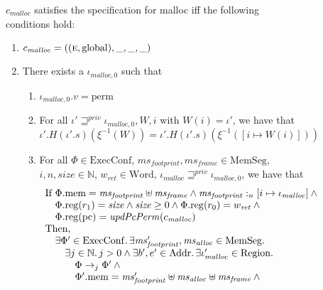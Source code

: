 \documentclass[format=acmsmall, review=true, screen=true]{acmart}
\newcommand{\var}[1]{\mathit{#1}}
\newcommand{\hs}{\var{ms}}
\newcommand{\ms}{\hs}
\newcommand{\pcreg}{\mathrm{pc}}
\newcommand{\heap}{\var{mem}}
\newcommand{\hsframe}{\hs_\var{frame}}
\newcommand{\size}{\var{size}}
\newcommand{\plainproj}[1]{\mathrm{#1}}
\newcommand{\memheap}[1][\Phi]{#1.\plainproj{mem}}
\newcommand{\memreg}[1][\Phi]{#1.\plainproj{reg}}
\newcommand{\plainfun}[2]{
  \ifthenelse{\equal{#2}{}}
  {\mathit{#1}}
  {\mathit{#1}(#2)}
}
\newcommand{\updatePcPerm}[1]{\plainfun{updPcPerm}{#1}}
\newcommand{\futurestr}{\mathbin{\sqsupseteq}^{\var{priv}}}
\newcommand{\heapSat}[3][\heap]{#1 :_{#2} #3}
\newcommand{\codelabel}[1]{\mathit{#1}}
\newcommand{\malloc}{\codelabel{malloc}}
\newcommand{\plaindom}[1]{\mathrm{#1}}
\newcommand{\Words}{\plaindom{Word}}
\newcommand{\Addrs}{\plaindom{Addr}}
\newcommand{\ExecConfs}{\plaindom{ExecConf}}
\newcommand{\HeapSegments}{\plaindom{MemSeg}}
\newcommand{\nats}{\mathbb{N}}
\newcommand{\Regions}{\plaindom{Region}}
\newcommand{\plainperm}[1]{\textsc{#1}}
\newcommand{\entry}{\plainperm{e}}
\newcommand{\plainlocality}[1]{\mathrm{#1}}
\newcommand{\glob}{\plainlocality{global}}
\newcommand{\plainview}[1]{\mathrm{#1}}
\newcommand{\perma}{\plainview{perm}}
\newcommand{\step}[1][]{\rightarrow_{#1}}
\newenvironment{toplas}%
    {\color{OliveGreen}}{}
\begin{document}
\begin{toplas}
\begin{figure}[htb]
  \centering
  \begin{definition}
    \label{spec:malloc}
    $c_\malloc$ satisfies the specification for malloc iff the following
    conditions hold:
    \begin{enumerate}
    \item \label{item:malloc-spec:eg} $c_\malloc = ((\entry,\glob),\_,\_,\_)$
    \item \label{item:malloc-spec:reg} There exists a $\iota_{\malloc,0}$ such that
      \begin{enumerate}
      \item \label{item:malloc-spec:perm} $\iota_{\malloc,0}.v = \perma$
      \item \label{item:malloc-spec:independent} For all $\iota' \futurestr \iota_{\malloc,0}, W,i$ with
        $W(i)=\iota'$, we have that
        \begin{equation*}
          \iota'.H (\iota'.s) (\xi^{-1}(W)) = \iota'.H (\iota'.s) (\xi^{-1}([i \mapsto W(i)]))
        \end{equation*}
      \item \label{item:malloc-spec:correct-exec} For all $\Phi \in \ExecConfs$, $\ms_{\var{footprint}}, \hsframe \in
        \HeapSegments$, $i, n, \size \in \nats$, $w_{\var{ret}} \in \Words$,
        $\iota_\malloc \futurestr \iota_{\malloc,0}$, we have that
        \[
          \begin{array}{l}
            \text{If }
            \memheap = \ms_{\var{footprint}} \uplus \hsframe \land \heapSat[\ms_{\var{footprint}}]{n}{[i \mapsto \iota_\malloc]} \land{} \\
            \quad\memreg(r_1) = \size \land \size \geq 0 \land  \memreg(r_0) = w_{\var{ret}} \land{} \\
            \quad \memreg(\pcreg) = \updatePcPerm{c_\malloc} \\ %
            \text{Then, } \\
            \quad \exists \Phi' \in \ExecConfs \ldotp \exists \ms_{\var{footprint}}', \ms_{\var{alloc}} \in \HeapSegments\ldotp\\
            \qquad \exists j \in \nats \ldotp j > 0 \land \exists b',e'\in \Addrs \ldotp \exists \iota_\malloc' \in \Regions \ldotp \\
            \qquad \quad \Phi \step[j] \Phi' \land{} \\
            \qquad \quad \memheap[\Phi']=\ms_{\var{footprint}}' \uplus \hs_{\var{alloc}} \uplus \hsframe \land{}\\

\end{array}\]
\end{enumerate}
\end{enumerate}
\end{definition}
\end{figure}
\end{toplas}
\end{document}
